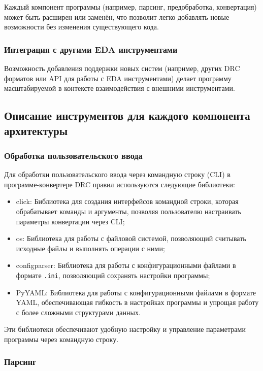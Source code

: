 Каждый компонент программы (например, парсинг, предобработка, конвертация)
может быть расширен или заменён,
что позволит легко добавлять новые возможности
без изменения существующего кода.
  
\subsubsection{Интеграция с другими EDA инструментами}

Возможность добавления поддержки новых систем
(например, других DRC форматов или API для работы с EDA инструментами)
делает программу масштабируемой
в контексте взаимодействия с внешними инструментами.

\subsection{Описание инструментов для каждого компонента архитектуры}

\subsubsection{Обработка пользовательского ввода}

Для обработки пользовательского ввода через командную строку (CLI)
в программе-конвертере DRC правил используются следующие библиотеки:

\begin{itemize}
	\item click: Библиотека для создания интерфейсов командной строки,
		которая обрабатывает команды и аргументы,
		позволяя пользователю настраивать параметры конвертации через CLI;
	\item os: Библиотека для работы с файловой системой,
		позволяющий считывать исходные файлы
		и выполнять операции с ними;
	\item configparser: Библиотека для работы
		с конфигурационными файлами в формате \texttt{.ini},
		позволяющий сохранять настройки программы;
	\item PyYAML:
		Библиотека для работы с конфигурационными файлами в формате YAML,
		обеспечивающая гибкость в настройках программы
		и упрощая работу с более сложными структурами данных.
\end{itemize}

Эти библиотеки обеспечивают удобную настройку
и управление параметрами программы через командную строку.

\subsubsection{Парсинг}

